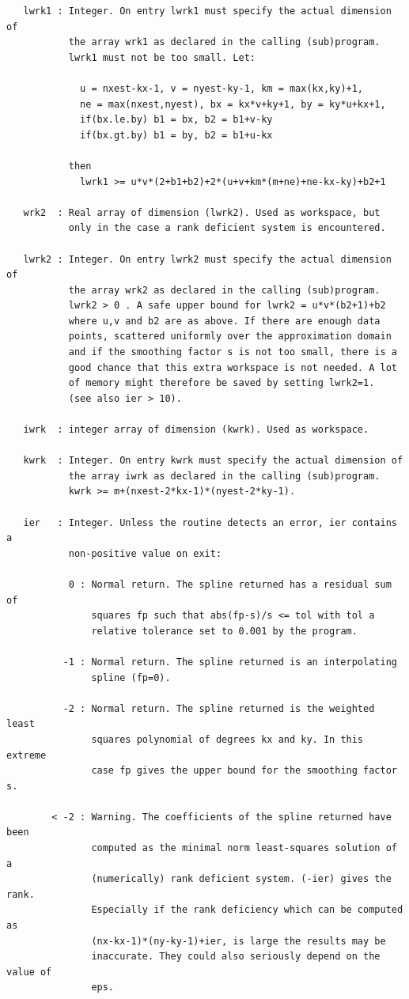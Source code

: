 \documentclass[11pt,twoside]{article}
\begin{document}
\begin{verbatim}
   lwrk1 : Integer. On entry lwrk1 must specify the actual dimension of
           the array wrk1 as declared in the calling (sub)program.
           lwrk1 must not be too small. Let:

             u = nxest-kx-1, v = nyest-ky-1, km = max(kx,ky)+1,
             ne = max(nxest,nyest), bx = kx*v+ky+1, by = ky*u+kx+1,
             if(bx.le.by) b1 = bx, b2 = b1+v-ky
             if(bx.gt.by) b1 = by, b2 = b1+u-kx  

           then
             lwrk1 >= u*v*(2+b1+b2)+2*(u+v+km*(m+ne)+ne-kx-ky)+b2+1

   wrk2  : Real array of dimension (lwrk2). Used as workspace, but
           only in the case a rank deficient system is encountered.

   lwrk2 : Integer. On entry lwrk2 must specify the actual dimension of
           the array wrk2 as declared in the calling (sub)program.
           lwrk2 > 0 . A safe upper bound for lwrk2 = u*v*(b2+1)+b2
           where u,v and b2 are as above. If there are enough data
           points, scattered uniformly over the approximation domain
           and if the smoothing factor s is not too small, there is a
           good chance that this extra workspace is not needed. A lot
           of memory might therefore be saved by setting lwrk2=1.
           (see also ier > 10).

   iwrk  : integer array of dimension (kwrk). Used as workspace.

   kwrk  : Integer. On entry kwrk must specify the actual dimension of
           the array iwrk as declared in the calling (sub)program.
           kwrk >= m+(nxest-2*kx-1)*(nyest-2*ky-1).

   ier   : Integer. Unless the routine detects an error, ier contains a
           non-positive value on exit:

           0 : Normal return. The spline returned has a residual sum of
               squares fp such that abs(fp-s)/s <= tol with tol a
               relative tolerance set to 0.001 by the program.

          -1 : Normal return. The spline returned is an interpolating
               spline (fp=0).

          -2 : Normal return. The spline returned is the weighted least 
               squares polynomial of degrees kx and ky. In this extreme
               case fp gives the upper bound for the smoothing factor s.

        < -2 : Warning. The coefficients of the spline returned have been
               computed as the minimal norm least-squares solution of a
               (numerically) rank deficient system. (-ier) gives the rank.
               Especially if the rank deficiency which can be computed as
               (nx-kx-1)*(ny-ky-1)+ier, is large the results may be
               inaccurate. They could also seriously depend on the value of
               eps.


\end{verbatim}
\end{document}
